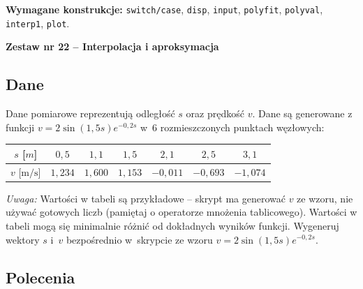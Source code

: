 \documentclass[a4paper,11pt]{article}
\begin{document}
\vspace{0.3cm}
\begin{ramka}
\textbf{Wymagane konstrukcje:}
\texttt{switch/case}, \texttt{disp}, \texttt{input}, \texttt{polyfit}, \texttt{polyval}, \texttt{interp1}, \texttt{plot}.
\end{ramka}

\clearpage
\begin{center}
  {\large\bfseries Zestaw nr 22 \quad -- \quad Interpolacja i aproksymacja}
\end{center}
\hrulefill
\vspace{0.4cm}

\subsection*{Dane}

Dane pomiarowe reprezentują odległość $s$ oraz prędkość $v$.
Dane są generowane z funkcji $v = 2\sin(1{,}5s)e^{-0{,}2s}$ w~6 rozmieszczonych punktach węzłowych:

\begin{center}
\begin{tabular}{c|cccccc}
  \toprule
  $s$ [$m$] & $0{,}5$ & $1{,}1$ & $1{,}5$ & $2{,}1$ & $2{,}5$ & $3{,}1$ \\
  \midrule
  $v$ [$\text{m/s}$] & $1{,}234$ & $1{,}600$ & $1{,}153$ & $-0{,}011$ & $-0{,}693$ & $-1{,}074$ \\
  \bottomrule
\end{tabular}
\end{center}

\medskip
\textit{Uwaga:} Wartości w tabeli są przykładowe – skrypt ma generować $v$ ze wzoru, nie używać gotowych liczb (pamiętaj o operatorze mnożenia tablicowego). Wartości w tabeli mogą się minimalnie różnić od dokładnych wyników funkcji.
Wygeneruj wektory $s$ i~$v$ bezpośrednio w~skrypcie ze wzoru $v = 2\sin(1{,}5s)e^{-0{,}2s}$.

\subsection*{Polecenia}
\end{document}
